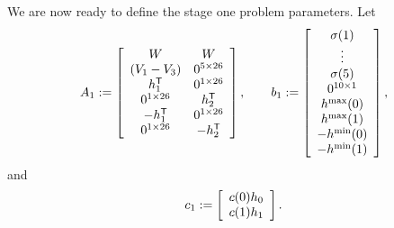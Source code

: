 We are now ready to define the stage one problem parameters.  Let
\[
A_1:=\left[\begin{array}{cc}
W & W\\
(V_1 - V_3) & 0^{5\times 26}\\
h_1^{\mbox{\scriptsize\sf T}} & 0^{1\times 26}\\
0^{1\times 26} & h_2^{\mbox{\scriptsize\sf T}}\\
-h_1^{\mbox{\scriptsize\sf T}} & 0^{1\times26}\\
0^{1\times 26} & -h_2^{\mbox{\scriptsize\sf T}}
\end{array}\right], \qquad
b_1:=\left[\begin{array}{c}
\sigma(1)\\
\vdots\\
\sigma(5)\\
0^{10\times 1}\\
h^{\text{max}}(0)\\
h^{\text{max}}(1)\\
-h^{\text{min}}(0)\\
-h^{\text{min}}(1)\end{array}\right],
\]
and
\[
c_1:=\left[\begin{array}{c}c(0) h_0\\ c(1) h_1\end{array}\right].
\]

